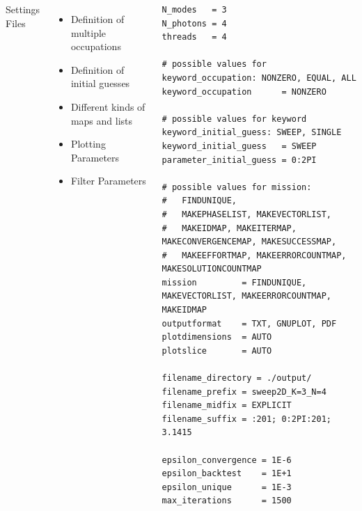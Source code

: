 \begin{frame}[fragile]
%
\begin{columns}[t]
\phantom{x}

\vspace{6pt}
\begin{Large}
	Settings Files
\end{Large}
\vspace{12pt}
%
\begin{itemize}
\item Definition of multiple occupations
\item Definition of initial guesses
\item Different kinds of maps and lists
\item Plotting Parameters
\item Filter Parameters
\end{itemize}
%
\begin{verbatim}
N_modes   = 3
N_photons = 4
threads   = 4

# possible values for keyword_occupation: NONZERO, EQUAL, ALL
keyword_occupation      = NONZERO

# possible values for keyword keyword_initial_guess: SWEEP, SINGLE
keyword_initial_guess   = SWEEP
parameter_initial_guess = 0:2PI

# possible values for mission:
#   FINDUNIQUE,
#   MAKEPHASELIST, MAKEVECTORLIST,
#   MAKEIDMAP, MAKEITERMAP, MAKECONVERGENCEMAP, MAKESUCCESSMAP,
#   MAKEEFFORTMAP, MAKEERRORCOUNTMAP, MAKESOLUTIONCOUNTMAP
mission         = FINDUNIQUE, MAKEVECTORLIST, MAKEERRORCOUNTMAP, MAKEIDMAP
outputformat    = TXT, GNUPLOT, PDF
plotdimensions  = AUTO
plotslice       = AUTO

filename_directory = ./output/
filename_prefix = sweep2D_K=3_N=4
filename_midfix = EXPLICIT
filename_suffix = :201; 0:2PI:201; 3.1415

epsilon_convergence = 1E-6
epsilon_backtest    = 1E+1
epsilon_unique      = 1E-3
max_iterations      = 1500
\end{verbatim}
\end{columns}
%
\end{frame}


